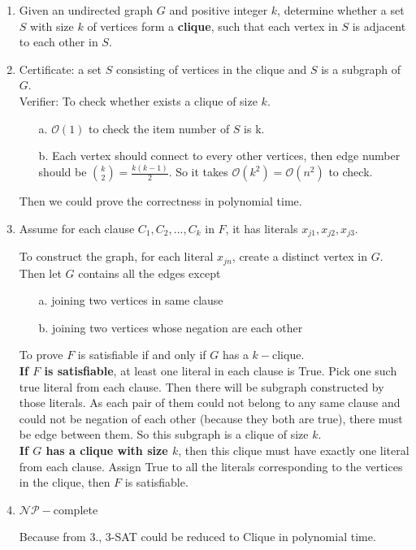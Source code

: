 \documentclass{assignment}
\begin{document}
        \begin{homeworkProblem}
\begin{enumerate}
\item Given an undirected graph $G$ and positive integer $k$, determine whether a set $S$ with size $k$ of vertices form a \textbf{clique}, such that each vertex in $S$ is adjacent to each other in $S$.
\item Certificate: a set $S$ consisting of vertices in the clique and $S$ is a subgraph of $G$. \\
Verifier: To check whether exists a clique of size $k$.
\begin{enumerate}
\item[a.] $\mathcal{O}(1)$ to check the item number of $S$ is k.
\item[b.] Each vertex should connect to every other vertices, then edge number should be $\displaystyle \binom{k}{2}=\frac{k(k-1)}{2} $. So it takes $\mathcal{O}(k^2)=\mathcal{O}(n^2)$ to check.  
\end{enumerate}
Then we could prove the correctness in polynomial time.

\item Assume for each clause $C_1, C_2, ... ,C_k$ in $F$, it has literals $x_{j1},x_{j2}, x_{j3}$. 

To construct the graph, for each literal $x_{jn}$, create a distinct vertex in $G$. Then let $G$ contains all the edges except 

\begin{enumerate}
\item[a.] joining two vertices in same clause
\item[b.] joining two vertices whose  negation are each other
\end{enumerate}
To prove $F$ is satisfiable if and only if $G$ has a $k-$clique.   \\ 
\textbf{If $F$ is satisfiable}, at least one literal in each clause is True. Pick one such true literal from each clause. Then there will be subgraph constructed by those literals. As each pair of them could not belong to any same clause and could not be negation of each other (because they both are true), there must be edge between them. So this subgraph is a clique of size $k$.\\
\textbf{If $G$ has a clique with size $k$}, then this clique must have exactly one literal from each clause. Assign  True to all the literals corresponding to the vertices in the clique, then  $F$ is satisfiable.
 
\item $\mathcal{NP}-$complete

Because from 3., 3-SAT could be reduced to Clique in polynomial time.

\end{enumerate}

             \end{homeworkProblem}              
              
\end{document}

